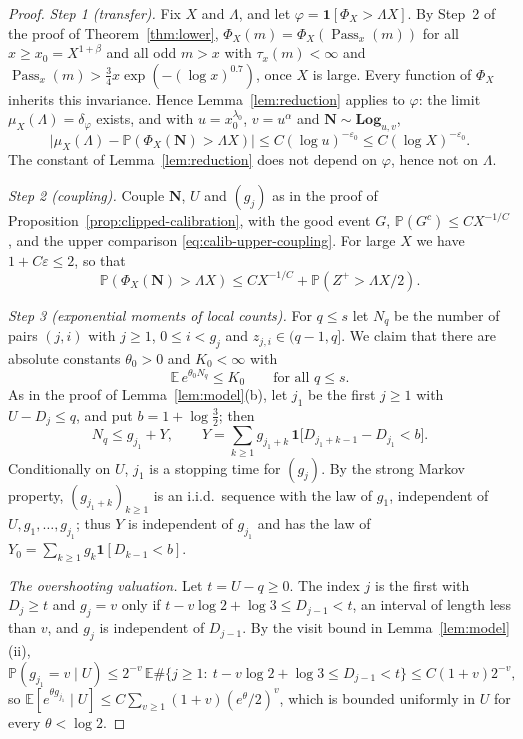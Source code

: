 \begin{proof}
\emph{Step 1 (transfer).} Fix $X$ and $\Lambda$, and let
$\varphi=\mathbf 1[\Phi_X>\Lambda X]$. By Step~2 of the proof of
Theorem~\ref{thm:lower}, $\Phi_X(m)=\Phi_X(\operatorname{Pass}_x(m))$ for
all $x\ge x_0=X^{1+\beta}$ and all odd $m>x$ with $\tau_x(m)<\infty$ and
$\operatorname{Pass}_x(m)>\frac34x\exp(-(\log x)^{0.7})$, once $X$ is
large. Every function of $\Phi_X$ inherits this invariance. Hence
Lemma~\ref{lem:reduction} applies to $\varphi$: the limit
$\mu_X(\Lambda)=\delta_\varphi$ exists, and with $u=x_0^{\lambda_0}$,
$v=u^\alpha$ and $\mathbf N\sim\mathbf{Log}_{u,v}$,
\[
 \bigl|\mu_X(\Lambda)-\mathbb P(\Phi_X(\mathbf N)>\Lambda X)\bigr|
 \le C(\log u)^{-\varepsilon_0}\le C(\log X)^{-\varepsilon_0}.
\]
The constant of Lemma~\ref{lem:reduction} does not depend on
$\varphi$, hence not on $\Lambda$.

\emph{Step 2 (coupling).} Couple $\mathbf N$, $U$ and $(g_j)$ as in the
proof of Proposition~\ref{prop:clipped-calibration}, with the good event
$G$, $\mathbb P(G^c)\le CX^{-1/C}$, and the upper comparison
\eqref{eq:calib-upper-coupling}. For large $X$ we have
$1+C\varepsilon\le2$, so that
\[
 \mathbb P(\Phi_X(\mathbf N)>\Lambda X)
 \le CX^{-1/C}+\mathbb P(Z^+>\Lambda X/2).
\]

\emph{Step 3 (exponential moments of local counts).} For $q\le s$ let
$N_q$ be the number of pairs $(j,i)$ with $j\ge1$, $0\le i<g_j$ and
$z_{j,i}\in(q-1,q]$. We claim that there are absolute constants
$\theta_0>0$ and $K_0<\infty$ with
\begin{equation}\label{eq:local-exp-moment}
 \mathbb E\,e^{\theta_0N_q}\le K_0\qquad\text{for all }q\le s.
\end{equation}
As in the proof of Lemma~\ref{lem:model}(b), let $j_1$ be the first
$j\ge1$ with $U-D_j\le q$, and put $b=1+\log\frac32$; then
\[
 N_q\le g_{j_1}+Y,\qquad
 Y=\sum_{k\ge1}g_{j_1+k}\,\mathbf 1\bigl[D_{j_1+k-1}-D_{j_1}<b\bigr].
\]
Conditionally on $U$, $j_1$ is a stopping time for $(g_j)$. By the strong
Markov property, $(g_{j_1+k})_{k\ge1}$ is an i.i.d.\ sequence with the
law of $g_1$, independent of $U,g_1,\ldots,g_{j_1}$; thus $Y$ is
independent of $g_{j_1}$ and has the law of
$Y_0=\sum_{k\ge1}g_k\mathbf 1[D_{k-1}<b]$.

\emph{The overshooting valuation.} Let $t=U-q\ge0$. The index $j$ is the
first with $D_j\ge t$ and $g_j=v$ only if
$t-v\log2+\log3\le D_{j-1}<t$, an interval of length less than $v$, and
$g_j$ is independent of $D_{j-1}$. By the visit bound in
Lemma~\ref{lem:model}(ii),
\[
 \mathbb P(g_{j_1}=v\mid U)\le 2^{-v}\,
 \mathbb E\#\{j\ge1:\ t-v\log2+\log3\le D_{j-1}<t\}
 \le C(1+v)2^{-v},
\]
so $\mathbb E[e^{\theta g_{j_1}}\mid U]\le C\sum_{v\ge1}(1+v)(e^\theta/2)^v$,
which is bounded uniformly in $U$ for every $\theta<\log2$.


\end{proof}
